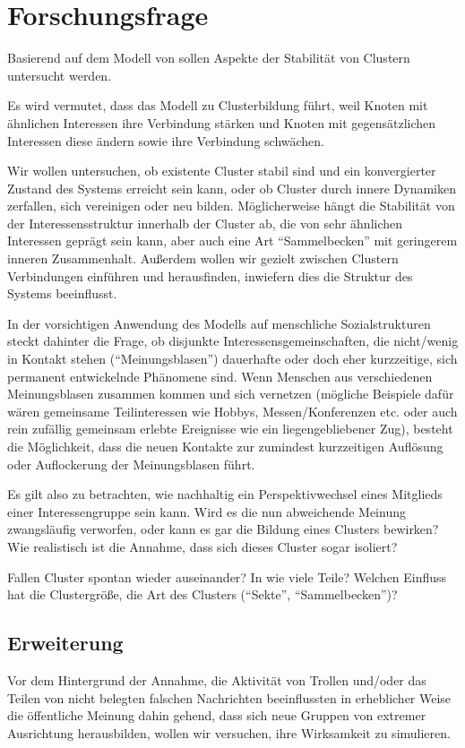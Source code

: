 \documentclass[11pt, a4paper]{scrartcl}
\begin{document}
\section{Forschungsfrage}

Basierend auf dem Modell von \autocite{Koehler-Bussmeier2018} sollen Aspekte der Stabilität von Clustern untersucht werden.

Es wird vermutet, dass das Modell zu Clusterbildung führt, weil Knoten mit ähnlichen Interessen ihre Verbindung stärken und Knoten mit gegensätzlichen Interessen diese ändern sowie ihre Verbindung schwächen.

Wir wollen untersuchen, ob existente Cluster stabil sind und ein konvergierter Zustand des Systems erreicht sein kann, oder ob Cluster durch innere Dynamiken zerfallen, sich vereinigen oder neu bilden. Möglicherweise hängt die Stabilität von der Interessensstruktur innerhalb der Cluster ab, die von sehr ähnlichen Interessen geprägt sein kann, aber auch eine Art "`Sammelbecken"' mit geringerem inneren Zusammenhalt. Außerdem wollen wir gezielt zwischen Clustern Verbindungen einführen und herausfinden, inwiefern dies die Struktur des Systems beeinflusst.

In der vorsichtigen Anwendung des Modells auf menschliche Sozialstrukturen steckt dahinter die Frage, ob disjunkte Interessensgemeinschaften, die nicht/wenig in Kontakt stehen ("`Meinungsblasen"') dauerhafte oder doch eher kurzzeitige, sich permanent entwickelnde Phänomene sind. Wenn Menschen aus verschiedenen Meinungsblasen zusammen kommen und sich vernetzen (mögliche Beispiele dafür wären gemeinsame Teilinteressen wie Hobbys, Messen/Konferenzen etc. oder auch rein zufällig gemeinsam erlebte Ereignisse wie ein liegengebliebener Zug), besteht die Möglichkeit, dass die neuen Kontakte zur zumindest kurzzeitigen Auflösung oder Auflockerung der Meinungsblasen führt.

Es gilt also zu betrachten, wie nachhaltig ein Perspektivwechsel eines Mitglieds einer Interessengruppe sein kann. Wird es die nun abweichende Meinung zwangsläufig verworfen, oder kann es gar die Bildung eines Clusters bewirken? Wie realistisch ist die Annahme, dass sich dieses Cluster sogar isoliert?

Fallen Cluster spontan wieder auseinander? In wie viele Teile? Welchen Einfluss hat die Clustergröße, die Art des Clusters ("`Sekte"', "`Sammelbecken"')?

\subsection{Erweiterung}
Vor dem Hintergrund der Annahme, die Aktivität von Trollen und/oder das Teilen von nicht belegten falschen Nachrichten beeinflussten in erheblicher Weise die öffentliche Meinung dahin gehend, dass sich neue Gruppen von  extremer Ausrichtung herausbilden, wollen wir versuchen, ihre Wirksamkeit zu simulieren.
\end{document}
